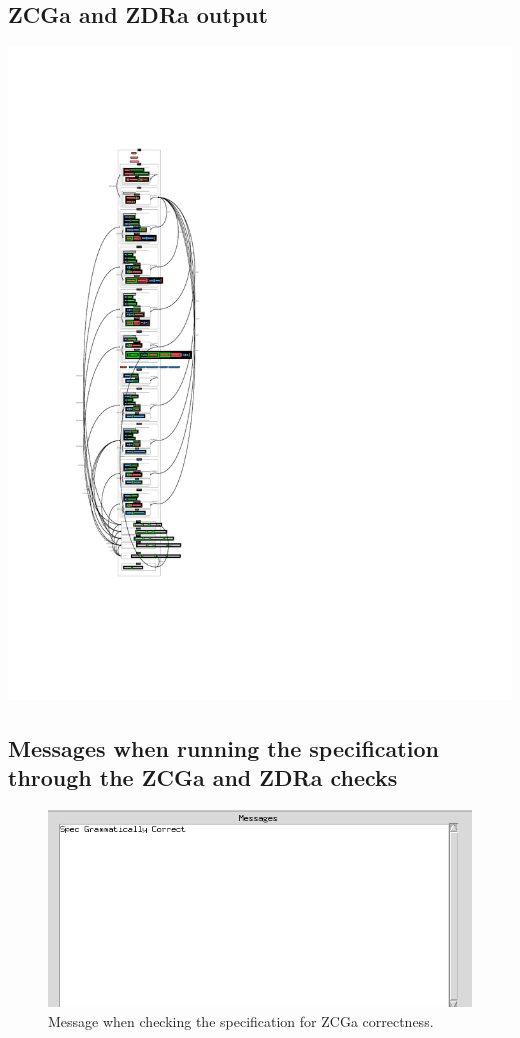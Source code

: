 \subsection{ZCGa and ZDRa output}
\label{app:failzdraout}
\noindent \includegraphics[clip, trim=0cm 4cm 6cm 4.2cm]{examples/nonworkzdra/1n2.pdf}

\subsection{Messages when running the specification through the ZCGa and ZDRa checks}
\label{app:failzdraoutmes}

\begin{figure}[H]
\includegraphics[scale=0.7]{examples/nonworkzdra/correct.png}
\caption{Message when checking the specification for ZCGa correctness.}
\end{figure}

